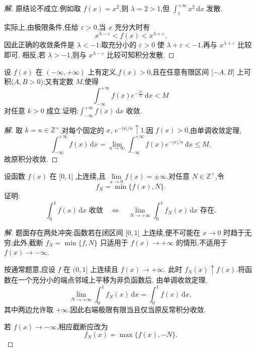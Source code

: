\documentclass[../../数学分析培优讲义(答案版).tex]{subfiles}
\begin{document}
\begin{proof}[解]
原结论不成立.例如取 $f(x)=x^2$,则 $\lambda=2>1$,但
$\displaystyle\int_1^{+\infty}x^2\,\mathrm{d}x$ 发散.

实际上,由极限条件,任给 $\varepsilon>0$,当 $x$ 充分大时有
\[
    x^{\lambda-\varepsilon}<f(x)<x^{\lambda+\varepsilon}.
\]
因此正确的收敛条件是 $\lambda<-1$:取充分小的 $\varepsilon>0$ 使
$\lambda+\varepsilon<-1$,再与 $x^{\lambda+\varepsilon}$ 比较即可.
相反,若 $\lambda>-1$,则与 $x^{\lambda-\varepsilon}$ 比较可知积分发散.
\end{proof}

\begin{example}
设 $f(x)$ 在 $(-\infty,+\infty)$ 上有定义,$f(x)>0$,且在任意有限区间 $\lbrack -A,B\rbrack$ 上可积($A,B>0$);又有定数 $M$,使得
\[
    \int_{-\infty}^{+\infty}f(x)e^{-\frac{|x|}{k}}\,\mathrm{d}x<M
\]
对任意 $k>0$ 成立.证明:$\displaystyle\int_{-\infty}^{+\infty}f(x)\,\mathrm{d}x$ 收敛.
\end{example}

\begin{proof}[解]
取 $k=n\in\mathbb{Z}^+$.对每个固定的 $x$,
$e^{-|x|/n}\uparrow1$.因 $f(x)>0$,由单调收敛定理,
\[
    \int_{-\infty}^{+\infty}f(x)\,\mathrm{d}x
    =\lim\limits_{n\to\infty}\int_{-\infty}^{+\infty}
    f(x)e^{-|x|/n}\,\mathrm{d}x\leq M.
\]
故原积分收敛.
\end{proof}

\begin{example}
设函数 $f(x)$ 在 $\lbrack 0,1\rbrack$ 上连续,且 $\displaystyle\lim\limits_{x\to0}f(x)=\pm\infty$.对任意 $N\in\mathbb{Z}^+$,令
\[
    f_N=\min\{f(x),N\}.
\]
证明:
\[
    \int_0^1f(x)\,\mathrm{d}x\text{ 收敛}
    \quad\Longleftrightarrow\quad
    \lim\limits_{N\to+\infty}\int_0^1f_N(x)\,\mathrm{d}x\text{ 存在}.
\]
\end{example}

\begin{proof}[解]
题面存在两处冲突:函数若在闭区间 $\lbrack0,1\rbrack$ 上连续,便不可能在
$x\to0$ 时趋于无穷;此外,截断 $f_N=\min\{f,N\}$ 只适用于
$f(x)\to+\infty$ 的情形,不适用于 $f(x)\to-\infty$.

按通常题意,应设 $f$ 在 $(0,1\rbrack$ 上连续且 $f(x)\to+\infty$.
此时 $f_N(x)\uparrow f(x)$.将函数在一个充分小的端点邻域上平移为非负函数后,
由单调收敛定理,
\[
    \lim\limits_{N\to+\infty}\int_0^1f_N(x)\,\mathrm{d}x
    =\int_0^1f(x)\,\mathrm{d}x,
\]
其中两边允许取 $+\infty$.因此右端极限有限当且仅当原反常积分收敛.

若 $f(x)\to-\infty$,相应截断应改为
\[
    f_N(x)=\max\{f(x),-N\}.
\]
\end{proof}
\end{document}
